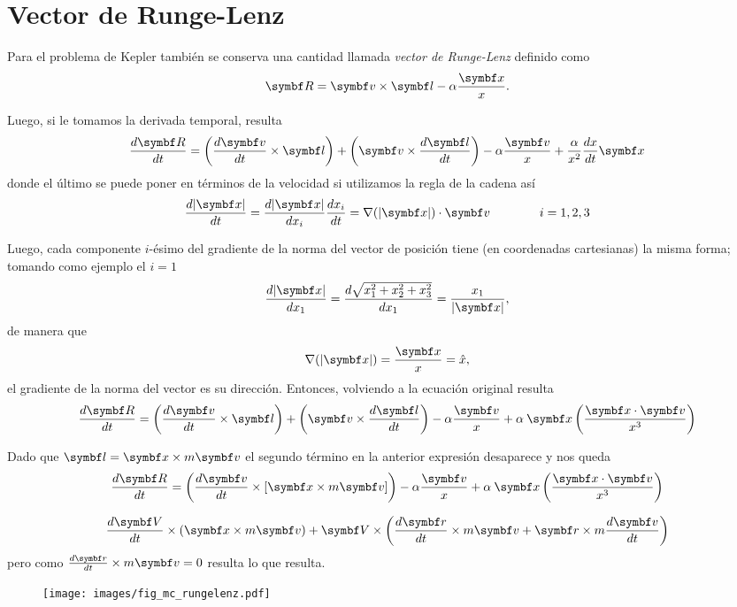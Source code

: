 \documentclass[10pt,oneside]{CBFT_book}
\begin{document}
\section{Vector de Runge-Lenz}

Para el problema de Kepler también se conserva una cantidad llamada {\it vector de Runge-Lenz} definido como
\[
	\vb{R} = \vb{v} \times \vb{l} - \alpha \frac{\vb{x}}{x}.
\]

Luego, si le tomamos la derivada temporal, resulta
\[
	\dtot{\vb{R}}{t} = \left( \dtot{\vb{v}}{t} \times \vb{l} \right) + \left( \vb{v} \times \dtot{\vb{l}}{t} \right)
	- \alpha\frac{ \vb{v} }{x} + \frac{ \alpha }{x^2} \dtot{x}{t} \vb{x}
\]
donde el último se puede poner en términos de la velocidad si utilizamos la regla de la cadena así
\[
	\dtot{|\vb{x}|}{t} = \dtot{|\vb{x}|}{x_i} \dtot{x_i}{t} = \nabla( |\vb{x}| )\cdot \vb{v} \qquad  \qquad i=1,2,3
\]

Luego, cada componente $i$-ésimo del gradiente de la norma del vector de posición tiene (en coordenadas cartesianas) la misma
forma; tomando como ejemplo el $i=1$
\[
	\dtot{|\vb{x}|}{x_1} = \dtot{\sqrt{x_1^2 + x_2^2 + x_3^2}}{x_1} = \frac{x_1}{|\vb{x}|},
\]
de manera que 
\[
	\nabla( |\vb{x}| ) = \frac{\vb{x}}{x} = \hat{x},
\]
el gradiente de la norma del vector es su dirección. Entonces, volviendo a la ecuación original resulta 
\[
	\dtot{\vb{R}}{t} = \left( \dtot{\vb{v}}{t} \times \vb{l} \right) + \left( \vb{v} \times \dtot{\vb{l}}{t} \right)
	- \alpha\frac{ \vb{v} }{x} + \alpha \:\vb{x} \left( \frac{ \pe{x}{v} }{x^3}\right) 
\]

Dado que $\vb{l} = \vb{x} \times m \vb{v}$ el segundo término en la anterior expresión desaparece y nos queda
\[
	\dtot{\vb{R}}{t} = \left( \dtot{\vb{v}}{t} \times [ \vb{x} \times m\vb{v} ] \right) 
	- \alpha\frac{ \vb{v} }{x} + \alpha \:\vb{x} \left( \frac{ \pe{x}{v} }{x^3}\right) 
\]


\[
	\dtot{\vb{V}}{t} \times ( \vb{x} \times m\vb{v} ) +
	\vb{V} \times \left( \dtot{\vb{r}}{t} \times m\vb{v} + \vb{r} \times m\dtot{\vb{v}}{t} \right)
\]
pero como $\dtot{\vb{r}}{t} \times m\vb{v} = 0$ resulta lo que resulta.
\begin{figure}[hbt]
	\begin{center}
	\texttt{[image: images/fig\_mc\_rungelenz.pdf]}	 
	\end{center}
	\caption{}
\end{figure} 
\end{document}
